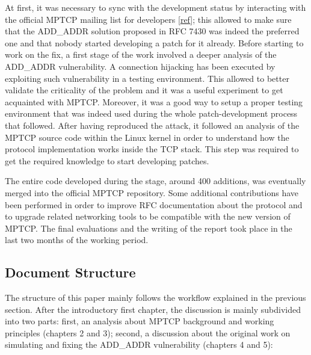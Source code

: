 \vspace{5mm}
At first, it was necessary to sync with the development status by interacting with the official MPTCP mailing list for developers [\href{https://listes-2.sipr.ucl.ac.be/sympa}{ref}]; this allowed to make sure that the ADD\_ADDR solution proposed in RFC 7430 was indeed the preferred one and that nobody started developing a patch for it already.
Before starting to work on the fix, a first stage of the work involved a deeper analysis of the ADD\_ADDR vulnerability. A connection hijacking has been executed by exploiting such vulnerability in a testing environment. This allowed to better validate the criticality of the problem and it was a useful experiment to get acquainted with MPTCP. Moreover, it was a good way to setup a proper testing environment that was indeed used during the whole patch-development process that followed.
After having reproduced the attack, it followed an analysis of the MPTCP source code within the Linux kernel in order to understand how the protocol implementation works inside the TCP stack. This step was required to get the required knowledge to start developing patches. 


The entire code developed during the stage, around 400 additions, was eventually merged into the official MPTCP repository. Some additional contributions have been performed in order to improve RFC documentation about the protocol and to upgrade related networking tools to be compatible with the new version of MPTCP.
The final evaluations and the writing of the report took place in the last two months of the working period.

\subsection{Document Structure}
The structure of this paper mainly follows the workflow explained in the previous section. After the introductory first chapter, the discussion is mainly subdivided into two parts: first, an analysis about MPTCP background and working principles (chapters 2 and 3); second, a discussion about the original work on simulating and fixing the ADD\_ADDR vulnerability (chapters 4 and 5):

